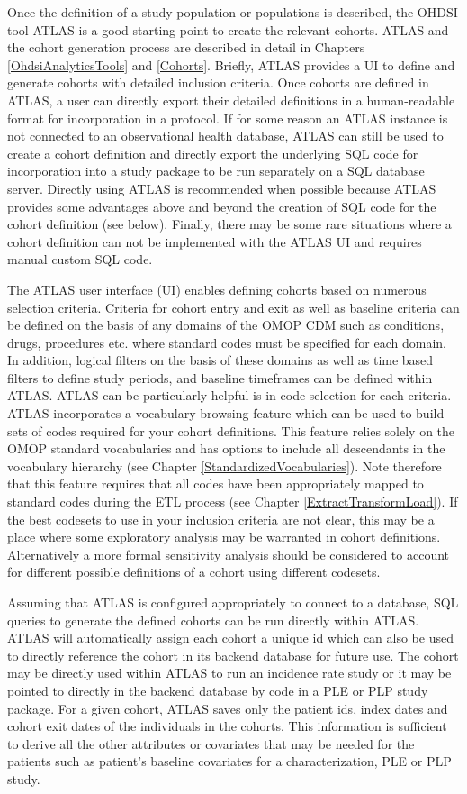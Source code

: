 \documentclass[11pt]{book}
\theoremstyle{definition}
\theoremstyle{definition}
\theoremstyle{definition}
\theoremstyle{remark}
\begin{document}
Once the definition of a study population or populations is described, the OHDSI tool ATLAS is a good starting point to create the relevant cohorts. ATLAS and the cohort generation process are described in detail in Chapters \ref{OhdsiAnalyticsTools} and \ref{Cohorts}. Briefly, ATLAS provides a UI to define and generate cohorts with detailed inclusion criteria. Once cohorts are defined in ATLAS, a user can directly export their detailed definitions in a human-readable format for incorporation in a protocol. If for some reason an ATLAS instance is not connected to an observational health database, ATLAS can still be used to create a cohort definition and directly export the underlying SQL code for incorporation into a study package to be run separately on a SQL database server. Directly using ATLAS is recommended when possible because ATLAS provides some advantages above and beyond the creation of SQL code for the cohort definition (see below). Finally, there may be some rare situations where a cohort definition can not be implemented with the ATLAS UI and requires manual custom SQL code.

The ATLAS user interface (UI) enables defining cohorts based on numerous selection criteria. Criteria for cohort entry and exit as well as baseline criteria can be defined on the basis of any domains of the OMOP CDM such as conditions, drugs, procedures etc. where standard codes must be specified for each domain. In addition, logical filters on the basis of these domains as well as time based filters to define study periods, and baseline timeframes can be defined within ATLAS. ATLAS can be particularly helpful is in code selection for each criteria. ATLAS incorporates a vocabulary browsing feature which can be used to build sets of codes required for your cohort definitions. This feature relies solely on the OMOP standard vocabularies and has options to include all descendants in the vocabulary hierarchy (see Chapter \ref{StandardizedVocabularies}). Note therefore that this feature requires that all codes have been appropriately mapped to standard codes during the ETL process (see Chapter \ref{ExtractTransformLoad}).
If the best codesets to use in your inclusion criteria are not clear, this may be a place where some exploratory analysis may be warranted in cohort definitions. Alternatively a more formal sensitivity analysis should be considered to account for different possible definitions of a cohort using different codesets.

Assuming that ATLAS is configured appropriately to connect to a database, SQL queries to generate the defined cohorts can be run directly within ATLAS. ATLAS will automatically assign each cohort a unique id which can also be used to directly reference the cohort in its backend database for future use. The cohort may be directly used within ATLAS to run an incidence rate study or it may be pointed to directly in the backend database by code in a PLE or PLP study package. For a given cohort, ATLAS saves only the patient ids, index dates and cohort exit dates of the individuals in the cohorts. This information is sufficient to derive all the other attributes or covariates that may be needed for the patients such as patient's baseline covariates for a characterization, PLE or PLP study.
\end{document}
